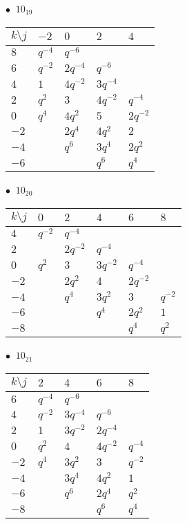 \begin{minipage}{\linewidth}
$\bullet\ $ $10_{19}$ \vspace{0.5em} \\
\begin{tabular}{l|llll}
$k \setminus j$ & $-2$ & $0$ & $2$ & $4$ \\
\hline
$8$ & $q^{-4}$ & $q^{-6}$ &  &  \\
$6$ & $q^{-2}$ & $2q^{-4}$ & $q^{-6}$ &  \\
$4$ & $1$ & $4q^{-2}$ & $3q^{-4}$ &  \\
$2$ & $q^{2}$ & $3$ & $4q^{-2}$ & $q^{-4}$ \\
$0$ & $q^{4}$ & $4q^{2}$ & $5$ & $2q^{-2}$ \\
$-2$ &  & $2q^{4}$ & $4q^{2}$ & $2$ \\
$-4$ &  & $q^{6}$ & $3q^{4}$ & $2q^{2}$ \\
$-6$ &  &  & $q^{6}$ & $q^{4}$ \\
\end{tabular}
\vspace{2em}
\end{minipage}
%
\begin{minipage}{\linewidth}
$\bullet\ $ $10_{20}$ \vspace{0.5em} \\
\begin{tabular}{l|lllll}
$k \setminus j$ & $0$ & $2$ & $4$ & $6$ & $8$ \\
\hline
$4$ & $q^{-2}$ & $q^{-4}$ &  &  &  \\
$2$ &  & $2q^{-2}$ & $q^{-4}$ &  &  \\
$0$ & $q^{2}$ & $3$ & $3q^{-2}$ & $q^{-4}$ &  \\
$-2$ &  & $2q^{2}$ & $4$ & $2q^{-2}$ &  \\
$-4$ &  & $q^{4}$ & $3q^{2}$ & $3$ & $q^{-2}$ \\
$-6$ &  &  & $q^{4}$ & $2q^{2}$ & $1$ \\
$-8$ &  &  &  & $q^{4}$ & $q^{2}$ \\
\end{tabular}
\vspace{2em}
\end{minipage}
%
\begin{minipage}{\linewidth}
$\bullet\ $ $10_{21}$ \vspace{0.5em} \\
\begin{tabular}{l|llll}
$k \setminus j$ & $2$ & $4$ & $6$ & $8$ \\
\hline
$6$ & $q^{-4}$ & $q^{-6}$ &  &  \\
$4$ & $q^{-2}$ & $3q^{-4}$ & $q^{-6}$ &  \\
$2$ & $1$ & $3q^{-2}$ & $2q^{-4}$ &  \\
$0$ & $q^{2}$ & $4$ & $4q^{-2}$ & $q^{-4}$ \\
$-2$ & $q^{4}$ & $3q^{2}$ & $3$ & $q^{-2}$ \\
$-4$ &  & $3q^{4}$ & $4q^{2}$ & $1$ \\
$-6$ &  & $q^{6}$ & $2q^{4}$ & $q^{2}$ \\
$-8$ &  &  & $q^{6}$ & $q^{4}$ \\
\end{tabular}
\vspace{2em}
\end{minipage}
